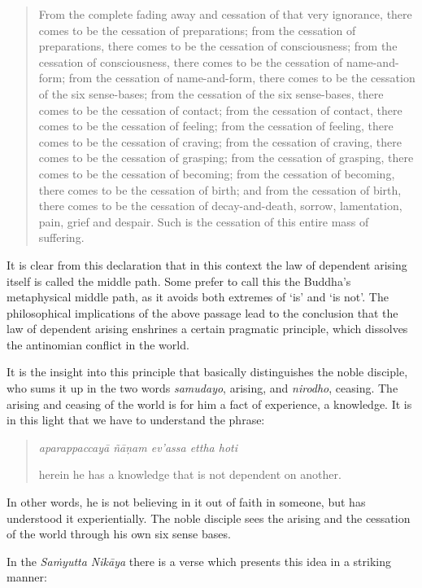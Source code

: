 \begin{quote}
From the complete fading away and cessation of that very ignorance, there comes to be the cessation of preparations; from the cessation of preparations, there comes to be the cessation of consciousness; from the cessation of consciousness, there comes to be the cessation of name-and-form; from the cessation of name-and-form, there comes to be the cessation of the six sense-bases; from the cessation of the six sense-bases, there comes to be the cessation of contact; from the cessation of contact, there comes to be the cessation of feeling; from the cessation of feeling, there comes to be the cessation of craving; from the cessation of craving, there comes to be the cessation of grasping; from the cessation of grasping, there comes to be the cessation of becoming; from the cessation of becoming, there comes to be the cessation of birth; and from the cessation of birth, there comes to be the cessation of decay-and-death, sorrow, lamentation, pain, grief and despair. Such is the cessation of this entire mass of suffering.
\end{quote}

It is clear from this declaration that in this context the law of dependent arising itself is called the middle path. Some prefer to call this the Buddha's metaphysical middle path, as it avoids both extremes of `is' and `is not'. The philosophical implications of the above passage lead to the conclusion that the law of dependent arising enshrines a certain pragmatic principle, which dissolves the antinomian conflict in the world.

It is the insight into this principle that basically distinguishes the noble disciple, who sums it up in the two words \emph{samudayo}, arising, and \emph{nirodho}, ceasing. The arising and ceasing of the world is for him a fact of experience, a knowledge. It is in this light that we have to understand the phrase:

\begin{quote}
\emph{aparappaccayā ñāṇam ev'assa ettha hoti}

herein he has a knowledge that is not dependent on another.
\end{quote}

In other words, he is not believing in it out of faith in someone, but has understood it experientially. The noble disciple sees the arising and the cessation of the world through his own six sense bases.

In the \emph{Saṁyutta Nikāya} there is a verse which presents this idea in a striking manner:

